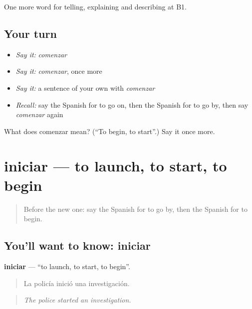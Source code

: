 \begin{grammarlens}[title={What you've built}]
One more word for telling, explaining and describing at B1.
\end{grammarlens}

\subsection*{Your turn}
\begin{itemize}
\raggedright
  \item \emph{Say it:} \emph{comenzar}
  \item \emph{Say it:} \emph{comenzar}, once more
  \item \emph{Say it:} a sentence of your own with \emph{comenzar}
  \item \emph{Recall:} say the Spanish for to go on, then the Spanish for to go by, then say \emph{comenzar} again
\end{itemize}

\begin{tcolorbox}[breakable,colback=teal!4,colframe=teal!35!black,title={Before you move on}]
What does comenzar mean? (\textquotedblleft{}To begin, to start\textquotedblright{}.) Say it once more.
\end{tcolorbox}
\section[iniciar]{iniciar — to launch, to start, to begin}

\label{lesson:ES-C542-iniciar}



\begin{quote}
Before the new one: say the Spanish for to go by, then the Spanish for to begin.
\end{quote}

\subsection*{You'll want to know: iniciar}
\textbf{iniciar} — \textquotedblleft{}to launch, to start, to begin\textquotedblright{}.

\begin{quote}
La policía inició una investigación.
\end{quote}

\begin{quote}
\emph{The police started an investigation.}
\end{quote}

